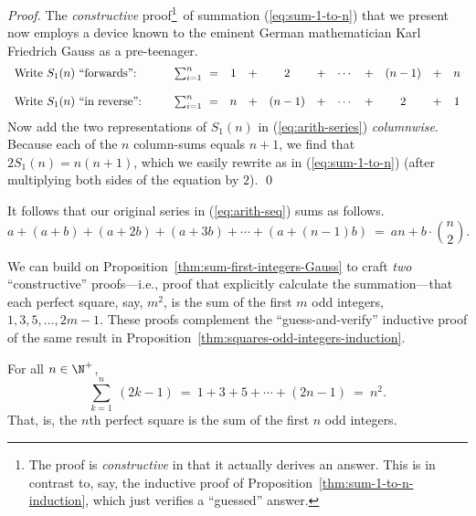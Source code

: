 \documentclass{article}
\begin{document}
\begin{proof}
The {\em constructive} proof\footnote{The proof is {\em constructive}
  in that it actually derives an answer.  This is in contrast to, say,
  the inductive proof of Proposition~\ref{thm:sum-1-to-n-induction},
  which just verifies a ``guessed'' answer.}~of summation
(\ref{eq:sum-1-to-n}) that we present now employs a device known to
the eminent German mathematician Karl Friedrich Gauss  as a pre-teenager.
\begin{equation}
\label{eq:arith-series}
\begin{array}{llccccccccc}
\mbox{Write $S_1(n)$ ``forwards'':} &
\hspace*{.25in}\sum_{i=1}^n \ = & 1 & + & 2   & + & \cdots & + & (n-1) & + & n \\
 & & & & & & & & & &  \\
\mbox{Write $S_1(n)$ ``in reverse'':} &
\hspace*{.25in}\sum_{i=1}^n \ = & n & + & (n-1) & + & \cdots & + & 2   & + & 1
\end{array}
\end{equation}
Now add the two representations of $S_1(n)$ in (\ref{eq:arith-series})
{\em columnwise}.  Because each of the $n$ column-sums equals $n+1$,
we find that $2 S_1(n) = n(n+1)$, which we easily rewrite as in
(\ref{eq:sum-1-to-n}) (after multiplying both sides of the equation by
$2$).  \qed
\end{proof}

It follows that our original series in (\ref{eq:arith-seq}) sums as
follows.
\[
a + (a+b) + (a+2b) + (a+3b) + \cdots + (a+(n-1)b) \ = \
an + b \cdot {n \choose 2}. 
\]

\medskip

We can build on Proposition~\ref{thm:sum-first-integers-Gauss} to
craft {\em two} ``constructive'' proofs---i.e., proof that explicitly
calculate the summation---that each perfect square, say, $m^2$, is the
sum of the first $m$ odd integers, $1, 3, 5, \ldots, 2m-1$.  These
proofs complement the ``guess-and-verify'' inductive proof of the same
result in Proposition~\ref{thm:squares-odd-integers-induction}.


\label{thm:squares-odd-integers-Gauss}
For all $n \in \N^+$,
\begin{equation}
\label{eq:sum-of-odds}
\sum_{k=1}^n \ (2k-1)
 \ = \ 1 + 3 + 5 + \cdots + (2n-1) \ = \ n^2.
\end{equation}
That, is, the $n$th perfect square is the sum of the first $n$ odd
integers.
\end{document}

